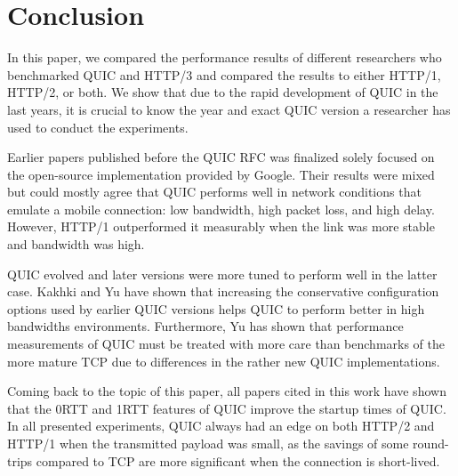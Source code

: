 \documentclass[conference]{IEEEtran}
\begin{document}
\section{Conclusion}

In this paper, we compared the performance results of different researchers who benchmarked QUIC and HTTP/3 and compared the results to either HTTP/1, HTTP/2, or both. We show that due to the rapid development of QUIC in the last years, it is crucial to know the year and exact QUIC version a researcher has used to conduct the experiments.

Earlier papers published before the QUIC RFC was finalized solely focused on the open-source implementation provided by Google. Their results were mixed but could mostly agree that QUIC performs well in network conditions that emulate a mobile connection: low bandwidth, high packet loss, and high delay. However, HTTP/1 outperformed it measurably when the link was more stable and bandwidth was high.

QUIC evolved and later versions were more tuned to perform well in the latter case. Kakhki \cite{Kakhki} and Yu \cite{Yu2} have shown that increasing the conservative configuration options used by earlier QUIC versions helps QUIC to perform better in high bandwidths environments. Furthermore, Yu has shown that performance measurements of QUIC must be treated with more care than benchmarks of the more mature TCP due to differences in the rather new QUIC implementations. 

Coming back to the topic of this paper, all papers cited in this work have shown that the 0RTT and 1RTT features of QUIC improve the startup times of QUIC. In all presented experiments, QUIC always had an edge on both HTTP/2 and HTTP/1 when the transmitted payload was small, as the savings of some round-trips compared to TCP are more significant when the connection is short-lived.



\end{document}
